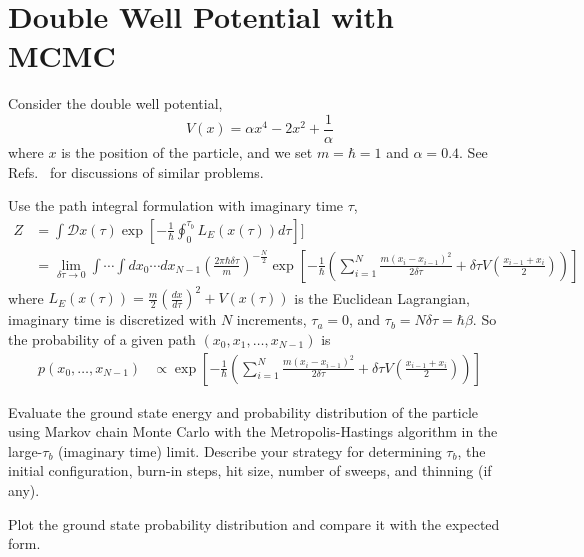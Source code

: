 \newpage
\section{Double Well Potential with MCMC}

Consider the double well potential,
\begin{equation}
  V(x) =  \alpha x^4  - 2x^2 + \frac{1}{\alpha}
\end{equation}
where $x$ is the position of the particle, and we set $m=\hbar=1$ and $\alpha = 0.4$.
See Refs.~\cite{Mittal:2020,Rodgers:2014} for discussions of similar problems.

Use the path integral formulation with imaginary time $\tau$,
\begin{align}
  Z & = \int \mathcal D x(\tau) \exp\left [-\frac{1}{\hbar}\oint^{\tau_b}_{0} L_E(x(\tau)) d\tau \right]]                                                                                                                                                                                        \\
    & =\lim_{\delta\tau\to 0}   \int \cdots \int dx_0\cdots dx_{N-1}  \left (\frac{2\pi \hbar \delta\tau}{m} \right)^{-\frac{N}{2}} \exp\left [-\frac{1}{\hbar} \left(\sum_{i=1}^{N}\frac{m(x_{i} - x_{i-1})^2}{2\delta\tau} + \delta\tau V \left(\frac{x_{i-1}+x_{i}}{2}\right )\right)\right ]
\end{align}
where $L_E(x(\tau)) = \textstyle\frac{m}{2} \left(\frac{dx}{d\tau}\right)^2 + V(x(\tau))$ is the Euclidean Lagrangian, imaginary time is discretized with $N$ increments, $\tau_a = 0$, and $\tau_b = N\delta\tau = \hbar\beta$.
So the probability of a given path $(x_0, x_1, \dots, x_{N-1})$ is
\begin{align}
  p(x_0,\dots, x_{N-1}) & \propto \exp\left [-\frac{1}{\hbar} \left(\sum_{i=1}^{N}\frac{m(x_{i} - x_{i-1})^2}{2\delta\tau} + \delta\tau V \left(\frac{x_{i-1}+x_{i}}{2}\right )\right)\right ]
\end{align}

\begin{problem}
Evaluate the ground state energy and probability distribution of the particle using Markov chain Monte Carlo with the Metropolis-Hastings algorithm in the large-$\tau_b$ (imaginary time) limit.
Describe your strategy for determining $\tau_b$, the initial configuration, burn-in steps, hit size, number of sweeps, and thinning (if any).
\end{problem}

\begin{problem}
Plot the ground state probability distribution and compare it with the expected form.
\end{problem}

